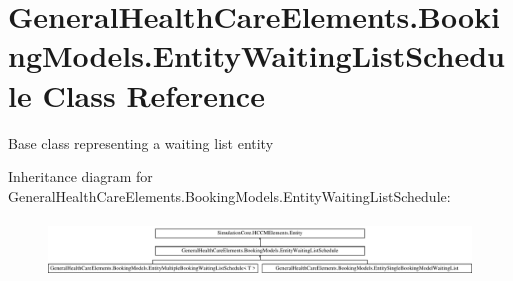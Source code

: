 \hypertarget{class_general_health_care_elements_1_1_booking_models_1_1_entity_waiting_list_schedule}{}\section{General\+Health\+Care\+Elements.\+Booking\+Models.\+Entity\+Waiting\+List\+Schedule Class Reference}
\label{class_general_health_care_elements_1_1_booking_models_1_1_entity_waiting_list_schedule}


Base class representing a waiting list entity  


Inheritance diagram for General\+Health\+Care\+Elements.\+Booking\+Models.\+Entity\+Waiting\+List\+Schedule\+:\begin{figure}[H]
\begin{center}
\leavevmode
\includegraphics[height=1.564246cm]{class_general_health_care_elements_1_1_booking_models_1_1_entity_waiting_list_schedule}
\end{center}
\end{figure}
